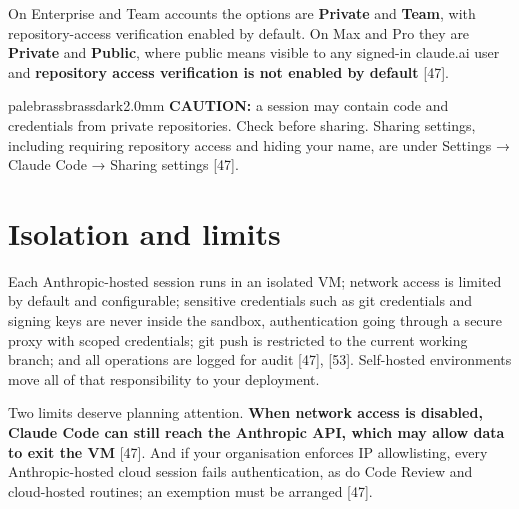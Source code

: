 \documentclass[11pt,a4paper,twoside,openany]{book}
\begin{document}
On Enterprise and Team accounts the options are \textbf{Private} and \textbf{Team}, with repository-access verification enabled by default. On Max and Pro they are \textbf{Private} and \textbf{Public}, where public means visible to any signed-in claude.ai user and \textbf{repository access verification is not enabled by default} [47].


\begin{calloutbox}{palebrass}{brassdark}{2.0mm}
\textbf{CAUTION:} a session may contain code and credentials from private repositories. Check before sharing. Sharing settings, including requiring repository access and hiding your name, are under Settings → Claude Code → Sharing settings [47].
\end{calloutbox}

\FloatBarrier
\setcounter{section}{5}
\section{Isolation and limits}

Each Anthropic-hosted session runs in an isolated VM; network access is limited by default and configurable; sensitive credentials such as git credentials and signing keys are never inside the sandbox, authentication going through a secure proxy with scoped credentials; git push is restricted to the current working branch; and all operations are logged for audit [47], [53]. Self-hosted environments move all of that responsibility to your deployment.


Two limits deserve planning attention. \textbf{When network access is disabled, Claude Code can still reach the Anthropic API, which may allow data to exit the VM} [47]. And if your organisation enforces IP allowlisting, every Anthropic-hosted cloud session fails authentication, as do Code Review and cloud-hosted routines; an exemption must be arranged [47].
\end{document}
